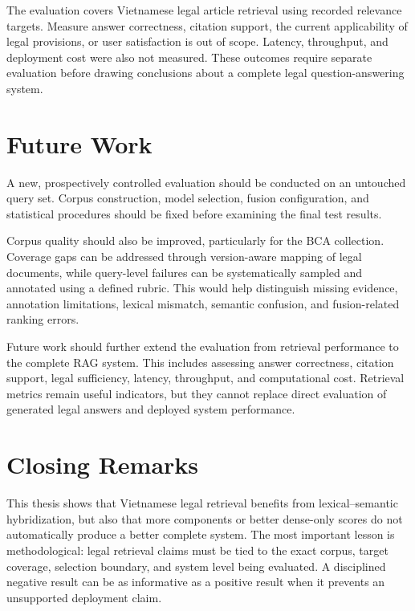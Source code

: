 The evaluation covers Vietnamese legal article retrieval using recorded relevance targets. Measure answer correctness, citation support, the current applicability of legal provisions, or user satisfaction is out of scope. Latency, throughput, and deployment cost were also not measured. These outcomes require separate evaluation before drawing conclusions about a complete legal question-answering system.


\section{Future Work}

A new, prospectively controlled evaluation should be conducted on an untouched query set. Corpus construction, model selection, fusion configuration, and statistical procedures should be fixed before examining the final test results.

Corpus quality should also be improved, particularly for the BCA collection. Coverage gaps can be addressed through version-aware mapping of legal documents, while query-level failures can be systematically sampled and annotated using a defined rubric. This would help distinguish missing evidence, annotation limitations, lexical mismatch, semantic confusion, and fusion-related ranking errors.

Future work should further extend the evaluation from retrieval performance to the complete RAG system. This includes assessing answer correctness, citation support, legal sufficiency, latency, throughput, and computational cost. Retrieval metrics remain useful indicators, but they cannot replace direct evaluation of generated legal answers and deployed system performance.

\section{Closing Remarks}

This thesis shows that Vietnamese legal retrieval benefits from lexical–semantic hybridization, but also that more components or better dense-only scores do not automatically produce a better complete system. The most important lesson is methodological: legal retrieval claims must be tied to the exact corpus, target coverage, selection boundary, and system level being evaluated. A disciplined negative result can be as informative as a positive result when it prevents an unsupported deployment claim.
